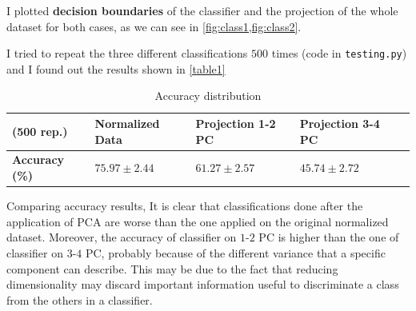 \documentclass[a4paper, 11pt]{article}
\begin{document}
	I plotted \textbf{decision boundaries} of the classifier and the projection of the whole dataset for both cases, as we can see in \vref{fig:class1,fig:class2}.
	
	I tried to repeat the three different classifications $500$ times (code in \texttt{testing.py}) and I found out the results shown in \vref{table1}
	
	\begin{table}[!ht]
		\centering
		\caption{Accuracy distribution}
		\label{table1}
		\begin{tabular}{@{}lllll@{}}
			\toprule
			(500 rep.)		& Normalized Data	& Projection 1-2 PC & Projection 3-4 PC	\\ \midrule
			\textbf{Accuracy (\%)}			& $75.97\pm2.44$ & $61.27\pm2.57$& $45.74\pm2.72$	 	\\ \bottomrule
		\end{tabular}
	\end{table}
	
	
	Comparing accuracy results, It is clear that classifications done after the application of PCA are worse than the one applied on the original normalized dataset. Moreover, the accuracy of classifier on $1$-$2$ PC is higher than the one of classifier on $3$-$4$ PC, probably because of the different variance that a specific component can describe.
	This may be due to the fact that reducing dimensionality may discard important information useful to discriminate a class from the others in a classifier.
	
	
\end{document}
